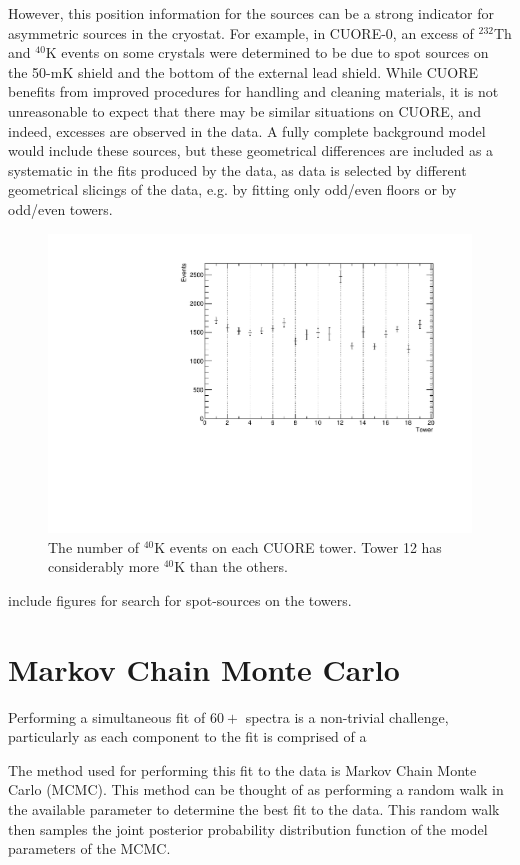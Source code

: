 However, this position information for the sources can be a strong indicator for asymmetric sources in the cryostat.
For example, in CUORE-0, an excess of $^{232}$Th and $^{40}$K events on some crystals were determined to be due to spot sources on the 50-mK shield and the bottom of the external lead shield.
While CUORE benefits from improved procedures for handling and cleaning materials, it is not unreasonable to expect that there may be similar situations on CUORE, and indeed, excesses are observed in the data.
A fully complete background model would include these sources, but these geometrical differences are included as a systematic in the fits produced by the data, as data is selected by different geometrical slicings of the data, e.g. by fitting only odd/even floors or by odd/even towers.

\begin{figure}
    \centering
    \includegraphics[width=0.8\linewidth]{Figures/k40ByTower.pdf}
    \caption[The number of $^{40}$K events at  on each CUORE tower.]
    {The number of $^{40}$K events on each CUORE tower.
    Tower 12 has considerably more $^40$K than the others.}
    \label{fig:my_label}
\end{figure}
include figures for search for spot-sources on the towers.



\section{Markov Chain Monte Carlo}
\label{sec:MCMC}
Performing a simultaneous fit of $60+$ spectra is a non-trivial challenge, particularly as each component to the fit is comprised of a 


The method used for performing this fit to the data is Markov Chain Monte Carlo (MCMC).
This method can be thought of as performing a random walk in the available parameter to determine the best fit to the data.
This random walk then samples the joint posterior probability distribution function of the model parameters of the MCMC.
 
